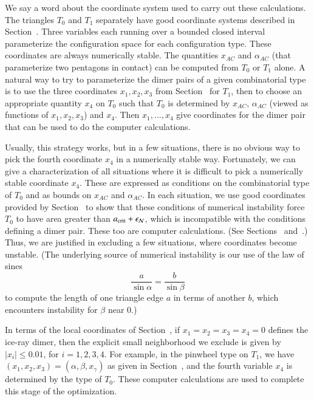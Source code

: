 We say a word about the coordinate system used to carry out these
calculations.  The triangles $T_0$ and $T_1$ separately have good
coordinate systems described in Section~.  Three
variables each running over a bounded closed interval parameterize the
configuration space for each configuration type.  These coordinates
are always numerically stable.  The quantities $x_{AC}$ and
$\alpha_{AC}$ (that parameterize two pentagons in contact)
can be computed from $T_0$ or $T_1$ alone.  A natural
way to try to parameterize the dimer pairs of a given combinatorial
type is to use the three coordinates $x_1,x_2,x_3$ from
Section~ for $T_1$, then to choose an appropriate
quantity $x_4$ on $T_0$ such that $T_0$ is determined by $x_{AC}$,
$\alpha_{AC}$ (viewed as functions of $x_1,x_2,x_3$) and $x_4$.  Then
$x_1,\ldots,x_4$ give coordinates for the dimer pair that can be used
to do the computer calculations.

Usually, this strategy works, but in a few situations, there is no
obvious way to pick the fourth coordinate $x_4$ in a numerically
stable way.  Fortunately, we can give a characterization of all
situations where it is difficult to pick a numerically stable
coordinate $x_4$.  These are expressed as conditions on the
combinatorial type of $T_0$ and as bounds on $x_{AC}$ and
$\alpha_{AC}$.  In each situation, we use good coordinates provided by
Section~ to show that these conditions of numerical
instability force $T_0$ to have area greater than $a_\text{crit}+\epsilon_{\mathcal N}$,
which is incompatible with the conditions defining a dimer pair.
These too are computer calculations.  (See Sections~
and~.)  Thus, we are justified in excluding a few
situations, where coordinates become unstable.  (The underlying source
of numerical instability is our use of the law of sines
\[
\frac{a}{\sin\alpha} = \frac{b}{\sin\beta}
\]
to compute the length of one triangle edge $a$ in terms of another
$b$, which encounters instability for $\beta$ near $0$.)

In terms of the local coordinates of Section~, if
$x_1=x_2=x_3=x_4=0$ defines the ice-ray dimer, then the explicit small
neighborhood we exclude is given by $|x_i|\le 0.01$, for $i=1,2,3,4$.
For example, in the pinwheel type on $T_1$, we have
$(x_1,x_2,x_3)=(\alpha,\beta,x_\gamma)$ as given in
Section~, and the fourth variable $x_4$ is determined by
the type of $T_0$.  These computer calculations are used to complete this
stage of the optimization.

